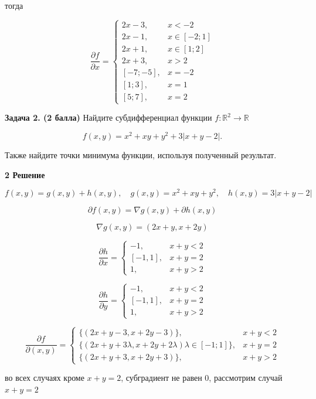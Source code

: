 \documentclass[12pt,a4paper]{article}
\begin{document}
тогда 

$$
\frac{\partial f}{\partial x} = 
\begin{cases}
  2x -3, & x < -2 \\
  2x -1,  & x \in [-2; 1] \\
  2x + 1, & x \in [1; 2] \\
  2x + 3, & x > 2 \\
  [-7; -5], & x = -2 \\
  [1; 3], & x = 1 \\
  [5; 7], & x = 2
\end{cases}
$$

\textbf{Задача 2. (2 балла)} Найдите субдифференциал функции $f: \mathbb{R}^2 \to \mathbb{R}$

\[
f(x, y) = x^2 + xy + y^2 + 3|x + y - 2|.
\]

Также найдите точки минимума функции, используя полученный результат.


\textbf{2 Решение}

$$
f(x, y) = g(x, y) + h(x, y), \quad
g(x, y) = x^2 + xy + y^2, \quad
h(x, y) = 3|x + y - 2|
$$

$$
\partial f(x, y) = \nabla g(x, y) + \partial h(x, y)
$$

$$
\nabla g(x, y) = (2x + y, x + 2y)
$$

$$
\frac{\partial h}{\partial x} = 
\begin{cases}
    {-1}, & x + y < 2 \\
    [-1, 1], & x+y = 2 \\
    {1}, & x +y > 2
    \end{cases}
$$

$$
\frac{\partial h}{\partial y} = 
\begin{cases}
    {-1}, & x + y < 2 \\
    [-1, 1], & x + y = 2 \\
    {1}, & x +y > 2
    \end{cases}
$$

$$
\frac{\partial f}{\partial (x, y)} = 
\begin{cases}
    \{(2x + y - 3, x + 2y - 3)\}, & x + y < 2 \\
    \{(2x + y + 3 \lambda, x + 2y + 2 \lambda) \lambda \in [-1; 1]\}, & x + y = 2 \\
    \{(2x + y + 3, x + 2y + 3)\}, & x + y > 2
\end{cases}
$$

\vspace{1em}

во всех случаях кроме $x + y = 2$, субградиент не равен 0, рассмотрим случай $x + y = 2$
\end{document}
